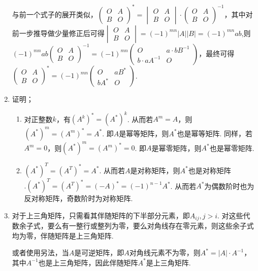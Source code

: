 \begin{enumerate}
    与前一个式子的展开类似，$\begin{pmatrix}
            O & A \\ B & O
        \end{pmatrix}^*=\begin{vmatrix}
            O & A \\ B & O
        \end{vmatrix}\cdot \begin{pmatrix}
            O & A \\ B & O
        \end{pmatrix}^{-1}$，其中对前一步推导做少量修正后可得$\begin{vmatrix}
            O & A \\ B & O
        \end{vmatrix}=(-1)^{mn}|A||B|=(-1)^{mn}ab$,则$(-1)^{mn}ab\begin{pmatrix}
            O & A \\ B & O
        \end{pmatrix}^{-1}=(-1)^{mn}\begin{pmatrix}
            O & a\cdot bB^{-1} \\ b\cdot aA^{-1} & O
        \end{pmatrix}$，最终可得$\begin{pmatrix}
            O & A \\ B & O
        \end{pmatrix}^*=(-1)^{mn}\begin{pmatrix}
            O & aB^* \\ bA^* & O
        \end{pmatrix}$.

\item 证明；\begin{enumerate}
        \item 对正整数$k$，有$(A^k)^*=(A^*)^k$. 从而若$A^m=A$，则$(A^*)^m=(A^m)^*=A^*$. 即$A$是幂等矩阵，则$A^*$也是幂等矩阵. 同样，若$A^m=0$，则$(A^*)^m=(A^m)^*=0$. 即$A$是幂零矩阵，则$A^*$也是幂零矩阵.

        \item $(A^*)^T=(A^T)^*=A^*$. 从而若$A$是对称矩阵，则$A^*$也是对称矩阵$. (A^*)^T=(A^T)^*=(-A)^*=(-1)^{n-1}A^*$. 从而若$A^*$为偶数阶时也为反对称矩阵，奇数阶时为对称矩阵.
    \end{enumerate}

\item 对于上三角矩阵，只需看其伴随矩阵的下半部分元素，即$A_{ij},j>i$. 对这些代数余子式，要么有一整行或整列为零，要么对角线存在零元素，则这些余子式均为零，伴随矩阵是上三角矩阵.\par 或者使用另法，当$A$是可逆矩阵，即$A$对角线元素不为零，则$A^*=|A|\cdot A^{-1}$，其中$A^{-1}$也是上三角矩阵，因此伴随矩阵$A^*$是上三角矩阵.


\end{enumerate}
